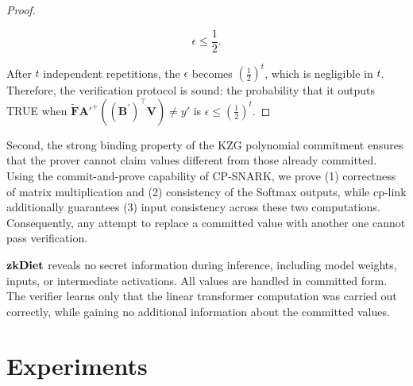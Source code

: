 \documentclass[letterpaper,twocolumn,10pt]{article}
\begin{document}
\begin{proof}
\begin{itemize}
    \begin{equation}\label{neqzero2-4}
        \epsilon \leq \frac{1}{2}.
    \end{equation}
\end{itemize}

After $t$ independent repetitions, the $\epsilon$ becomes $(\frac{1}{2})^t$, which is negligible in $t$. Therefore, the verification protocol is sound: the probability that it outputs TRUE when $\mathbf{\tilde F{A'}^+}((\mathbf{B}^{'})^\top \mathbf{V})\neq y'$ is $\epsilon \leq (\frac{1}{2})^t$.
\end{proof}
Second, the strong binding property of the KZG polynomial commitment ensures that the prover cannot claim values different from those already committed. Using the commit-and-prove capability of CP-SNARK, we prove (1) correctness of matrix multiplication and (2) consistency of the Softmax outputs, while cp-link additionally guarantees (3) input consistency across these two computations. Consequently, any attempt to replace a committed value with another one cannot pass verification.


${\bf zkDiet}$ reveals no secret information during inference, including model weights, inputs, or intermediate activations. All values are handled in committed form. The verifier learns only that the linear transformer computation was carried out correctly, while gaining no additional information about the committed values.
\section{Experiments}
\end{document}
